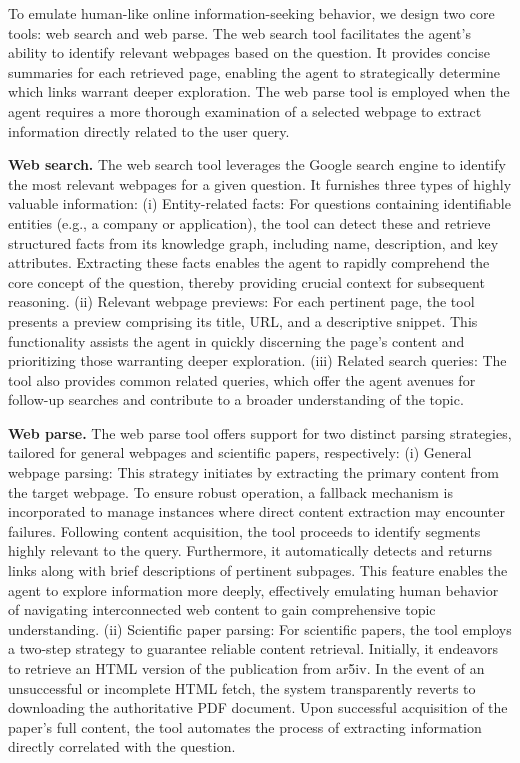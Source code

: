 \documentclass{article}
\begin{document}
To emulate human-like online information-seeking behavior, we design two core tools: web search and web parse. The web search tool facilitates the agent's ability to identify relevant webpages based on the question.
It provides concise summaries for each retrieved page, enabling the agent to strategically determine which links warrant deeper exploration.
The web parse tool is employed when the agent requires a more thorough examination of a selected webpage to extract information directly related to the user query.

\textbf{Web search.}
The web search tool leverages the Google search engine to identify the most relevant webpages for a given question.
It furnishes three types of highly valuable information:
(i) Entity-related facts: 
For questions containing identifiable entities (e.g., a company or application), the tool can detect these and retrieve structured facts from its knowledge graph, including name, description, and key attributes.
Extracting these facts enables the agent to rapidly comprehend the core concept of the question, thereby providing crucial context for subsequent reasoning.
(ii) Relevant webpage previews:
For each pertinent page, the tool presents a preview comprising its title, URL, and a descriptive snippet.
This functionality assists the agent in quickly discerning the page's content and prioritizing those warranting deeper exploration.
(iii) Related search queries: The tool also provides common related queries, which offer the agent avenues for follow-up searches and contribute to a broader understanding of the topic.

\textbf{Web parse.}
The web parse tool offers support for two distinct parsing strategies, tailored for general webpages and scientific papers, respectively:
(i) General webpage parsing: 
This strategy initiates by extracting the primary content from the target webpage. 
To ensure robust operation, a fallback mechanism is incorporated to manage instances where direct content extraction may encounter failures. 
Following content acquisition, the tool proceeds to identify segments highly relevant to the query. 
Furthermore, it automatically detects and returns links along with brief descriptions of pertinent subpages. 
This feature enables the agent to explore information more deeply, effectively emulating human behavior of navigating interconnected web content to gain comprehensive topic understanding.
(ii) Scientific paper parsing: For scientific papers, the tool employs a two-step strategy to guarantee reliable content retrieval. 
Initially, it endeavors to retrieve an HTML version of the publication from ar5iv.
In the event of an unsuccessful or incomplete HTML fetch, the system transparently reverts to downloading the authoritative PDF document.
Upon successful acquisition of the paper's full content, the tool automates the process of extracting information directly correlated with the question.
\end{document}
